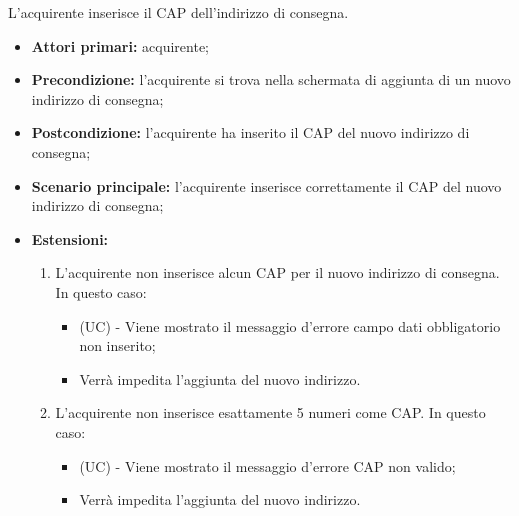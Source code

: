 L'acquirente inserisce il CAP dell'indirizzo di consegna.
\begin{itemize}
    \item \textbf{Attori primari:} acquirente;
    \item \textbf{Precondizione:} l'acquirente si trova nella schermata di aggiunta di un nuovo indirizzo di consegna;
    \item \textbf{Postcondizione:} l'acquirente ha inserito il CAP del nuovo indirizzo di consegna;
    \item \textbf{Scenario principale:} l'acquirente inserisce correttamente il CAP del nuovo indirizzo di consegna;
    \item \textbf{Estensioni:}
    \begin{enumerate}[label=\lett]
        \item L'acquirente non inserisce alcun CAP per il nuovo indirizzo di consegna. In questo caso:
        \begin{itemize}
            \item (UC) - Viene mostrato il messaggio d'errore campo dati obbligatorio non inserito;
            \item Verrà impedita l'aggiunta del nuovo indirizzo.
        \end{itemize}
        \item L'acquirente non inserisce esattamente 5 numeri come CAP. In questo caso:
        \begin{itemize}
            \item (UC) - Viene mostrato il messaggio d'errore CAP non valido;
            \item Verrà impedita l'aggiunta del nuovo indirizzo.
        \end{itemize}
    \end{enumerate}
\end{itemize}


